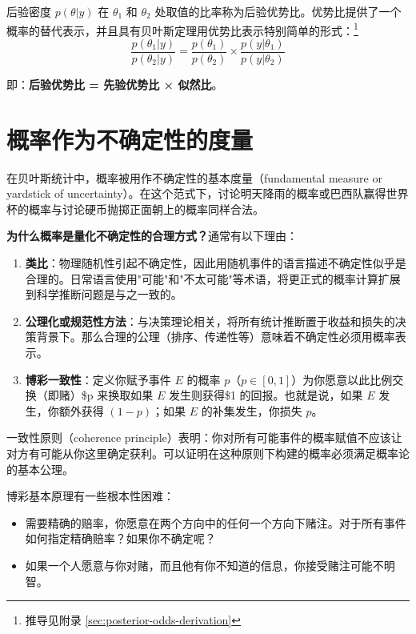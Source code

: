 后验密度 $p(\theta|y)$ 在 $\theta_1$ 和 $\theta_2$ 处取值的比率称为后验优势比。优势比提供了一个概率的替代表示，并且具有贝叶斯定理用优势比表示特别简单的形式：\footnote{推导见附录 \cref{sec:posterior-odds-derivation}}
\[
\frac{p(\theta_1|y)}{p(\theta_2|y)} = \frac{p(\theta_1)}{p(\theta_2)} \times \frac{p(y|\theta_1)}{p(y|\theta_2)}
\]

即：\textbf{后验优势比 = 先验优势比 × 似然比}。

\section{概率作为不确定性的度量}

在贝叶斯统计中，概率被用作不确定性的基本度量（fundamental measure or yardstick of uncertainty）。在这个范式下，讨论明天降雨的概率或巴西队赢得世界杯的概率与讨论硬币抛掷正面朝上的概率同样合法。

\textbf{为什么概率是量化不确定性的合理方式？}通常有以下理由：

\begin{enumerate}
  \item \textbf{类比}：物理随机性引起不确定性，因此用随机事件的语言描述不确定性似乎是合理的。日常语言使用"可能"和"不太可能"等术语，将更正式的概率计算扩展到科学推断问题是与之一致的。

  \item \textbf{公理化或规范性方法}：与决策理论相关，将所有统计推断置于收益和损失的决策背景下。那么合理的公理（排序、传递性等）意味着不确定性必须用概率表示。

  \item \textbf{博彩一致性}：定义你赋予事件 $E$ 的概率 $p$（$p \in [0, 1]$）为你愿意以此比例交换（即赌）\$p 来换取如果 $E$ 发生则获得\$1 的回报。也就是说，如果 $E$ 发生，你额外获得 $(1-p)$；如果 $E$ 的补集发生，你损失 $p$。
\end{enumerate}

一致性原则（coherence principle）表明：你对所有可能事件的概率赋值不应该让对方有可能从你这里确定获利。可以证明在这种原则下构建的概率必须满足概率论的基本公理。

博彩基本原理有一些根本性困难：
\begin{itemize}
  \item 需要精确的赔率，你愿意在两个方向中的任何一个方向下赌注。对于所有事件如何指定精确赔率？如果你不确定呢？
  \item 如果一个人愿意与你对赌，而且他有你不知道的信息，你接受赌注可能不明智。
\end{itemize}

